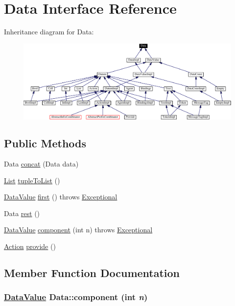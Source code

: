 \hypertarget{interfaceData}{
\section{Data  Interface Reference}
\label{interfaceData}
}
Inheritance diagram for Data:\begin{figure}[H]
\begin{center}
\leavevmode
\includegraphics[width=381pt]{interfaceData__inherit__graph}
\end{center}
\end{figure}
\subsection*{Public Methods}
\begin{CompactItemize}
\item 
Data \hyperlink{interfaceData_a0}{concat} (Data data)
\item 
\hyperlink{interfaceList}{List} \hyperlink{interfaceData_a1}{tuple\-To\-List} ()
\item 
\hyperlink{interfaceDataValue}{Data\-Value} \hyperlink{interfaceData_a2}{first} () throws \hyperlink{classExceptional}{Exceptional}
\item 
Data \hyperlink{interfaceData_a3}{rest} ()
\item 
\hyperlink{interfaceDataValue}{Data\-Value} \hyperlink{interfaceData_a4}{component} (int n) throws \hyperlink{classExceptional}{Exceptional}
\item 
\hyperlink{interfaceAction}{Action} \hyperlink{interfaceData_a5}{provide} ()
\end{CompactItemize}


\subsection{Member Function Documentation}
\hypertarget{interfaceData_a4}{
\subsubsection[component]{\setlength{\rightskip}{0pt plus 5cm}\hyperlink{interfaceDataValue}{Data\-Value} Data::component (int {\em n})}}
\label{interfaceData_a4}




